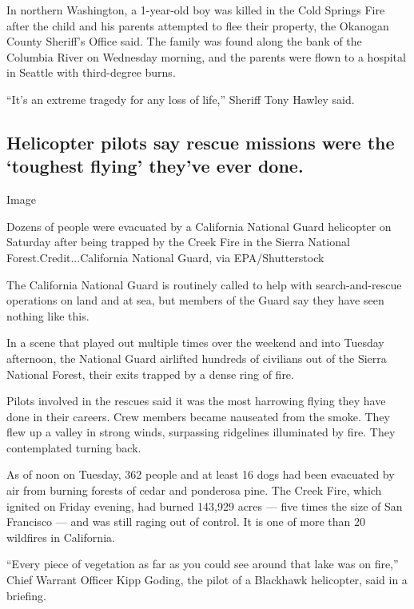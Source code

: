 In northern Washington, a 1-year-old boy was killed in the Cold Springs
Fire after the child and his parents attempted to flee their property,
the Okanogan County Sheriff's Office said. The family was found along
the bank of the Columbia River on Wednesday morning, and the parents
were flown to a hospital in Seattle with third-degree burns.

``It's an extreme tragedy for any loss of life,'' Sheriff Tony Hawley
said.

\hypertarget{helicopter-pilots-say-rescue-missions-were-the-toughest-flying-theyve-ever-done}{%
\subsection{Helicopter pilots say rescue missions were the `toughest
flying' they've ever
done.}\label{helicopter-pilots-say-rescue-missions-were-the-toughest-flying-theyve-ever-done}}

Image

Dozens of people were evacuated by a California National Guard
helicopter on Saturday after being trapped by the Creek Fire in the
Sierra National Forest.Credit...California National Guard, via
EPA/Shutterstock

The California National Guard is routinely called to help with
search-and-rescue operations on land and at sea, but members of the
Guard say they have seen nothing like this.

In a scene that played out multiple times over the weekend and into
Tuesday afternoon, the National Guard airlifted hundreds of civilians
out of the Sierra National Forest, their exits trapped by a dense ring
of fire.

Pilots involved in the rescues said it was the most harrowing flying
they have done in their careers. Crew members became nauseated from the
smoke. They flew up a valley in strong winds, surpassing ridgelines
illuminated by fire. They contemplated turning back.

As of noon on Tuesday, 362 people and at least 16 dogs had been
evacuated by air from burning forests of cedar and ponderosa pine. The
Creek Fire, which ignited on Friday evening, had burned 143,929 acres
--- five times the size of San Francisco --- and was still raging out of
control. It is one of more than 20 wildfires in California.

``Every piece of vegetation as far as you could see around that lake was
on fire,'' Chief Warrant Officer Kipp Goding, the pilot of a Blackhawk
helicopter, said in a briefing.

